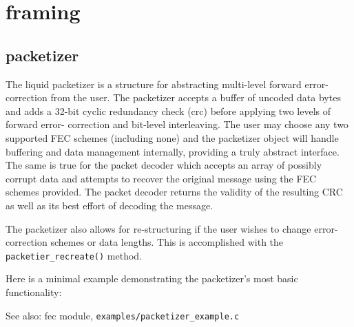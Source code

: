 % 
%

\section{framing}
\label{module:framing}

\subsection{packetizer}
\label{module:framing:packetizer}

The liquid packetizer is a structure for abstracting multi-level forward
error-correction from the user.
The packetizer accepts a buffer of uncoded data bytes and adds a 32-bit
cyclic redundancy check (crc) before applying two levels of forward error-
correction and bit-level interleaving.  The user may choose any two 
supported FEC schemes (including none) and the packetizer object will
handle buffering and data management internally, providing a truly abstract
interface.  The same is true for the packet decoder which accepts an array
of possibly corrupt data and attempts to recover the original message using
the FEC schemes provided.  The packet decoder returns the validity of the
resulting CRC as well as its best effort of decoding the message.

The packetizer also allows for re-structuring if the user wishes to change
error-correction schemes or data lengths.  This is accomplished with the
{\tt packetier\_recreate()} method.

Here is a minimal example demonstrating the packetizer's most basic
functionality:


See also: fec module, {\tt examples/packetizer\_example.c}


